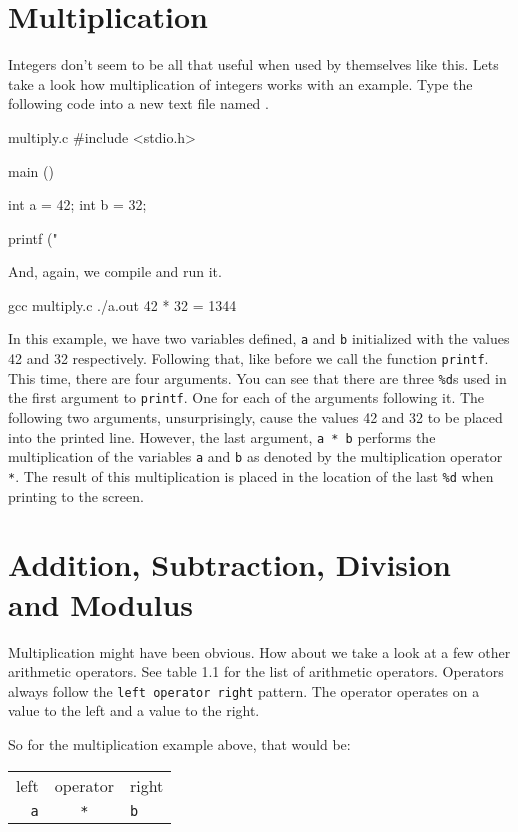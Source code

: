 \section{Multiplication}

Integers don't seem to be all that useful when used by themselves like this.
Lets take a look how multiplication of integers works with an example. Type
the following code into a new text file named .

\begin{code}{multiply.c}
#include <stdio.h>

main ()
{
    int a = 42;
    int b = 32;

    printf ("%
}
\end{code}

And, again, we compile and run it.

\begin{Terminal}
gcc multiply.c
./a.out
42 * 32 = 1344
\end{Terminal}

In this example, we have two variables defined, \verb|a| and \verb|b|
initialized with the values 42 and 32 respectively. Following that, like before
we call the function \verb|printf|. This time, there are four arguments. You can
see that there are three \verb|%d|s used in the first argument to \verb|printf|.
One for each of the arguments following it. The following two arguments,
unsurprisingly, cause the values 42 and 32 to be placed into the printed line.
However, the last argument, \verb|a * b| performs the multiplication of the
variables \verb|a| and \verb|b| as denoted by the multiplication operator
\verb|*|. The result of this multiplication is placed in the location of the
last \verb|%d| when printing to the screen.

\section{Addition, Subtraction, Division and Modulus}

Multiplication might have been obvious. How about we take a look at a few other
arithmetic operators. See table 1.1 for the list of arithmetic operators.
Operators always follow the \verb|left operator right| pattern. The operator
operates on a value to the left and a value to the right.

So for the multiplication example above, that would be:

\begin{center}
\begin{tabular}{r c l}
left & operator & right \\
\verb|a| & \verb|*| & \verb|b| \\
\end{tabular}
\end{center}

